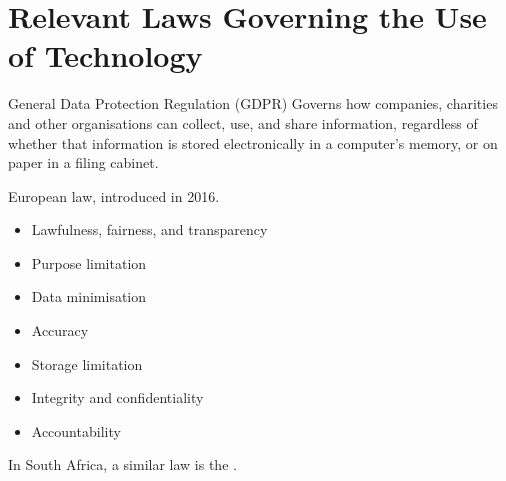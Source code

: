 \documentclass[\main/notes.tex]{subfiles}
\begin{document}
		\section[Relevant Laws]{Relevant Laws Governing the Use of Technology}
			\begin{definition}{General Data Protection Regulation (GDPR)}
				Governs how companies, charities and other organisations can collect, use, and share information, regardless of whether that information is stored electronically in a computer's memory, or on paper in a filing cabinet.

				European law, introduced in 2016.
				\begin{multicols}{2}
					\begin{itemize}
						\item Lawfulness, fairness, and transparency
						\item Purpose limitation
						\item Data minimisation
						\item Accuracy
						\item Storage limitation
						\item Integrity and confidentiality
						\item Accountability
					\end{itemize}
				\end{multicols}
			\end{definition}
			In South Africa, a similar law is the .

	\vbox{}
\end{document}
